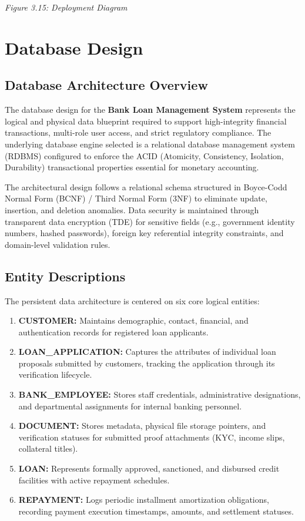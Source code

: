 \documentclass[12pt,a4paper,oneside]{report}
\begin{document}
\textit{Figure 3.15: Deployment Diagram}

\chapter{Database Design}

\section{Database Architecture Overview}

The database design for the \textbf{Bank Loan Management System} represents the logical and physical data blueprint required to support high-integrity financial transactions, multi-role user access, and strict regulatory compliance. The underlying database engine selected is a relational database management system (RDBMS) configured to enforce the ACID (Atomicity, Consistency, Isolation, Durability) transactional properties essential for monetary accounting.

The architectural design follows a relational schema structured in Boyce-Codd Normal Form (BCNF) / Third Normal Form (3NF) to eliminate update, insertion, and deletion anomalies. Data security is maintained through transparent data encryption (TDE) for sensitive fields (e.g., government identity numbers, hashed passwords), foreign key referential integrity constraints, and domain-level validation rules.

\section{Entity Descriptions}

The persistent data architecture is centered on six core logical entities:

\begin{enumerate}
  \item \textbf{CUSTOMER:} Maintains demographic, contact, financial, and authentication records for registered loan applicants.
  \item \textbf{LOAN\_APPLICATION:} Captures the attributes of individual loan proposals submitted by customers, tracking the application through its verification lifecycle.
  \item \textbf{BANK\_EMPLOYEE:} Stores staff credentials, administrative designations, and departmental assignments for internal banking personnel.
  \item \textbf{DOCUMENT:} Stores metadata, physical file storage pointers, and verification statuses for submitted proof attachments (KYC, income slips, collateral titles).
  \item \textbf{LOAN:} Represents formally approved, sanctioned, and disbursed credit facilities with active repayment schedules.
  \item \textbf{REPAYMENT:} Logs periodic installment amortization obligations, recording payment execution timestamps, amounts, and settlement statuses.
\end{enumerate}
\end{document}
